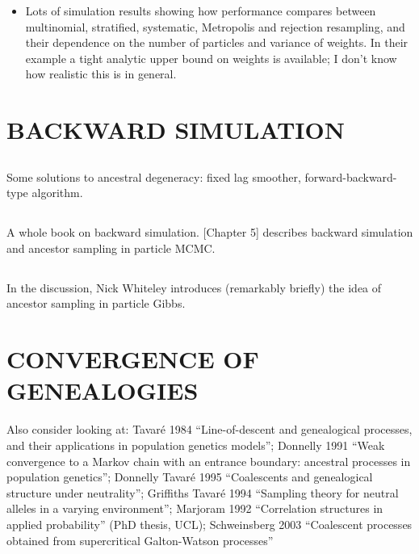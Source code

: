 \documentclass{article}
\begin{document}
\begin{itemize}
\item Lots of simulation results showing how performance compares between multinomial, stratified, systematic, Metropolis and rejection resampling, and their dependence on the number of particles and variance of weights. In their example a tight analytic upper bound on weights is available; I don't know how realistic this is in general.
\end{itemize}



%
\section*{BACKWARD SIMULATION}

\subsection*{\cite{kitagawa1996}}
Some solutions to ancestral degeneracy: fixed lag smoother, forward-backward-type algorithm.

\subsection*{\cite{doucet2009}}


\subsection*{\cite{lindsten2013}}
A whole book on backward simulation. [Chapter 5] describes backward simulation and ancestor sampling in particle MCMC.

\subsection*{\cite{whiteley2010}}
In the discussion, Nick Whiteley introduces (remarkably briefly) the idea of ancestor sampling in particle Gibbs.





\section*{CONVERGENCE OF GENEALOGIES}

Also consider looking at: 
Tavar\'e 1984 ``Line-of-descent and genealogical processes, and their applications in population genetics models''; 
Donnelly 1991 ``Weak convergence to  a Markov chain with an entrance boundary: ancestral processes in population genetics''; 
Donnelly Tavar\'e 1995 ``Coalescents and genealogical structure under neutrality''; 
Griffiths Tavar\'e 1994 ``Sampling theory for neutral alleles in a varying environment''; 
Marjoram 1992 ``Correlation structures in applied probability'' (PhD thesis, UCL);
Schweinsberg 2003 ``Coalescent processes obtained from supercritical Galton-Watson processes''
\end{document}
